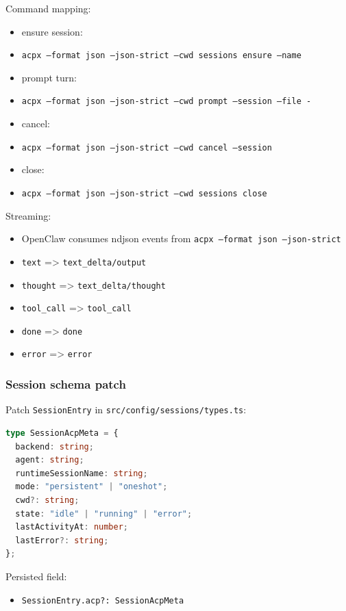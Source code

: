 Command mapping:

\begin{itemize}
  \item ensure session:
  \item \texttt{acpx --format json --json-strict --cwd   sessions ensure --name }
  \item prompt turn:
  \item \texttt{acpx --format json --json-strict --cwd   prompt --session  --file -}
  \item cancel:
  \item \texttt{acpx --format json --json-strict --cwd   cancel --session }
  \item close:
  \item \texttt{acpx --format json --json-strict --cwd   sessions close }
\end{itemize}


Streaming:

\begin{itemize}
  \item OpenClaw consumes ndjson events from \texttt{acpx --format json --json-strict}
  \item \texttt{text} => \texttt{text\_delta/output}
  \item \texttt{thought} => \texttt{text\_delta/thought}
  \item \texttt{tool\_call} => \texttt{tool\_call}
  \item \texttt{done} => \texttt{done}
  \item \texttt{error} => \texttt{error}
\end{itemize}


\subsubsection{Session schema patch}


Patch \texttt{SessionEntry} in \texttt{src/config/sessions/types.ts}:

\begin{lstlisting}[language=typescript]
type SessionAcpMeta = {
  backend: string;
  agent: string;
  runtimeSessionName: string;
  mode: "persistent" | "oneshot";
  cwd?: string;
  state: "idle" | "running" | "error";
  lastActivityAt: number;
  lastError?: string;
};
\end{lstlisting}


Persisted field:

\begin{itemize}
  \item \texttt{SessionEntry.acp?: SessionAcpMeta}
\end{itemize}


